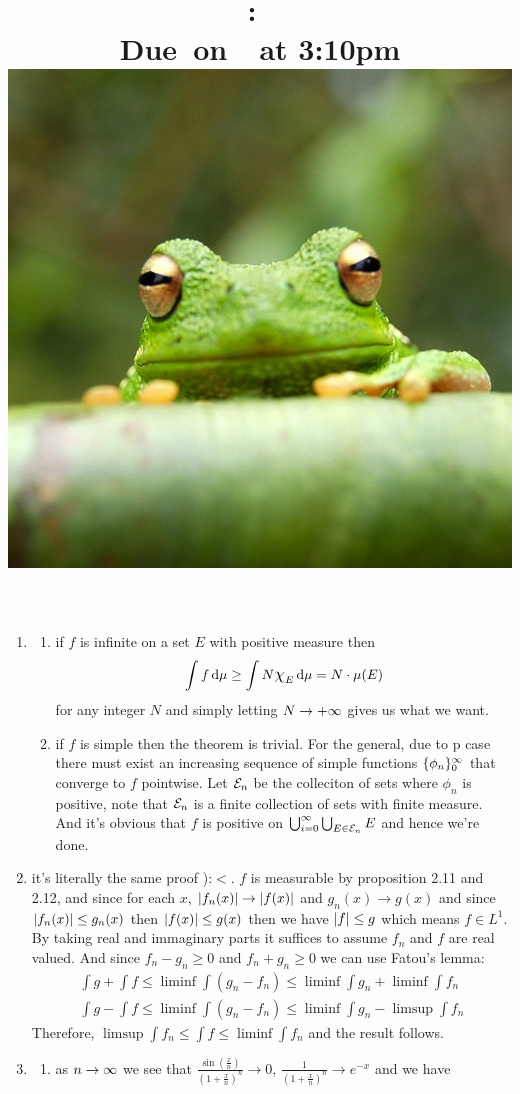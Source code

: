 \documentclass{article}
\title{
    \vspace{2in}
    \textmd{\textbf{\hmwkClass:\ \hmwkTitle}}\\
    \normalsize\vspace{0.1in}\small{Due\ on\ \hmwkDueDate\ at 3:10pm}\\
    \includegraphics[scale=0.2]{frog} \\
    \vspace{0.1in}\large{\textit{\hmwkClassTime}}
    \vspace{3in}
}
\author{\hmwkAuthorName}
\date{}
\begin{document}
\maketitle

\pagebreak 

\begin{homeworkProblem}
    \begin{enumerate}[label=\alph*.]
        \item 
        \begin{enumerate}[label=$\bullet$]
            \item if $f$ is infinite on a set $E$ with positive measure then
            \[
                \int f \dd \mu \geq \int N\scalebox{1.25}{$\chi$}_E \dd \mu=N\cdot\mu(E)
            \]
            for any integer $N$ and simply letting $N\to+\infty$ gives us what we want.
            \item if $f$ is simple then the theorem is trivial. For the general, due to p case there must exist an increasing sequence of simple functions $\{\phi_n\}_0^\infty$ that converge to $f$ pointwise. Let $\mathcal{E}_n$ be the colleciton of sets where $\phi_n$ is positive, note that $\mathcal{E}_n$ is a finite collection of sets with finite measure. And it's obvious that $f$ is positive on $\bigcup_{i=0}^\infty\bigcup_{E\in\mathcal{E}_n}E$ and hence we're done.
        \end{enumerate}
        \item it's literally the same proof ):$<$.
        $f$ is measurable by proposition 2.11 and 2.12, and since for each $x$, $\abs{f_n(x)}\to \abs{f(x)}$ and $g_n(x)\to g(x)$ and since $\abs{f_n(x)}\leq g_n(x)$ then $\abs{f(x)}\leq g(x)$ then we have $\abs{f}\leq g$ which means $f\in L^1$. By taking real and immaginary parts it suffices to assume $f_n$ and $f$ are real valued. And since $f_n-g_n\geq 0$ and $f_n+g_n\geq 0$ we can use Fatou's lemma:
        \begin{align*}
            \int g + \int f \leq \liminf\int(g_n-f_n) \leq\liminf \int g_n + \liminf \int f_n \\
            \int g - \int f \leq \liminf\int(g_n-f_n) \leq\liminf \int g_n-\limsup\int f_n
        \end{align*}
            Therefore, $\limsup \int f_n\leq\int f\leq \liminf\int f_n$ and the result follows. 
        \item
        \begin{enumerate}[label=$\bullet$]
            \item as $n\to\infty$ we see that $\frac{\sin(\frac{x}{n})}{(1+\frac{x}{n})^n}\to 0$, $\frac{1}{(1+\frac{x}{n})^n}\to e^{-x}$ and we have

\end{enumerate}
\end{enumerate}
\end{homeworkProblem}
\end{document}

